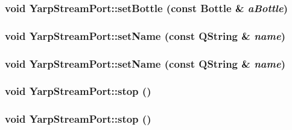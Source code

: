\label{class_yarp_stream_port_a6c55a434cf560c89f93d1a7d02b42a98}
\hypertarget{class_yarp_stream_port_a6c55a434cf560c89f93d1a7d02b42a98}{
\subsubsection[{setBottle}]{\setlength{\rightskip}{0pt plus 5cm}void YarpStreamPort::setBottle (const Bottle \& {\em aBottle})}}
\label{class_yarp_stream_port_a6c55a434cf560c89f93d1a7d02b42a98}
\hypertarget{class_yarp_stream_port_a82197dfe08009bf57b9892ba8c091bbc}{
\subsubsection[{setName}]{\setlength{\rightskip}{0pt plus 5cm}void YarpStreamPort::setName (const QString \& {\em name})}}
\label{class_yarp_stream_port_a82197dfe08009bf57b9892ba8c091bbc}
\hypertarget{class_yarp_stream_port_a82197dfe08009bf57b9892ba8c091bbc}{
\subsubsection[{setName}]{\setlength{\rightskip}{0pt plus 5cm}void YarpStreamPort::setName (const QString \& {\em name})}}
\label{class_yarp_stream_port_a82197dfe08009bf57b9892ba8c091bbc}
\hypertarget{class_yarp_stream_port_ae1c105a567b759d0f0c0c0068e0279a1}{
\subsubsection[{stop}]{\setlength{\rightskip}{0pt plus 5cm}void YarpStreamPort::stop ()}}
\label{class_yarp_stream_port_ae1c105a567b759d0f0c0c0068e0279a1}
\hypertarget{class_yarp_stream_port_ae1c105a567b759d0f0c0c0068e0279a1}{
\subsubsection[{stop}]{\setlength{\rightskip}{0pt plus 5cm}void YarpStreamPort::stop ()}}
\label{class_yarp_stream_port_ae1c105a567b759d0f0c0c0068e0279a1}


